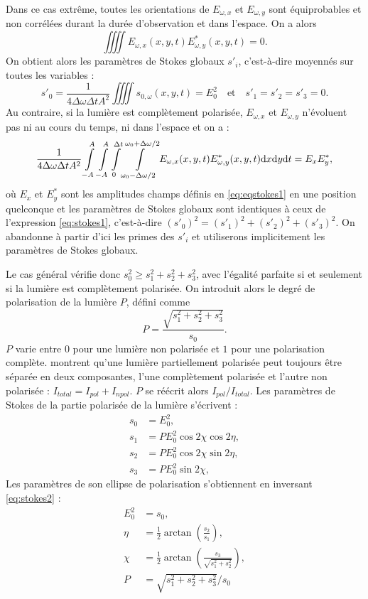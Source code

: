 Dans ce cas extrême, toutes les orientations de $E_{\omega,x}$ et $E_{\omega,y}$ sont équiprobables et non corrélées durant la durée d'observation et dans l'espace. On a alors
\begin{equation}
\iiiint{E_{\omega,x}(x,y,t) E^*_{\omega,y}(x,y,t)} = 0.
\end{equation}
On obtient alors les paramètres de Stokes globaux $s'_i$, c'est-à-dire moyennés sur toutes les variables :
\begin{equation}
s'_0=\frac{1}{4\Delta\omega\Delta t A^2}\iiiint{s_{0,\omega}(x,y,t)} = E_0^2 \quad\text{et}\quad s'_1=s'_2=s'_3=0.
\end{equation}
Au contraire, si la lumière est complètement polarisée, $E_{\omega,x}$ et $E_{\omega,y}$ n'évoluent pas ni au cours du temps, ni dans l'espace et on a :
\begin{equation}
\frac{1}{4\Delta\omega\Delta t A^2}\int\limits_{-A}^A\int\limits_{-A}^A\int\limits_0^{\Delta t}\int\limits_{\omega_0-\Delta\omega/2}^{\omega_0+\Delta\omega/2}{E_{\omega,x}(x,y,t) E^*_{\omega,y}(x,y,t)\mathrm{d} x\mathrm{d} y\mathrm{d} t} = E_x E^*_y,
\end{equation}
où $E_x$ et $E^*_y$ sont les amplitudes champs définis en \ref{eq:eqstokes1} en une position quelconque et les paramètres de Stokes globaux sont identiques à ceux de l'expression \ref{eq:stokes1}, c'est-à-dire $(s'_0)^2 = (s'_1)^2+(s'_2)^2+(s'_3)^2$. On abandonne à partir d'ici les primes des $s'_i$ et utiliserons implicitement les paramètres de Stokes globaux. 

Le cas général vérifie donc $s_0^2 \geq s_1^2+s_2^2+s_3^2$, avec l'égalité parfaite si et seulement si la lumière est complètement polarisée. On introduit alors le degré de polarisation de la lumière $P$, défini comme 
\begin{equation}
P = \frac{\sqrt{s_1^2+s_2^2+s_3^2}}{s_0}.
\end{equation}
$P$ varie entre $0$ pour une lumière non polarisée et $1$ pour une polarisation complète.  montrent qu'une lumière partiellement polarisée peut toujours être séparée en deux composantes, l'une complètement polarisée et l'autre non polarisée : $I_{total} = I_{pol} + I_{npol}$. $P$ se réécrit alors $I_{pol}/I_{total}$. Les paramètres de Stokes de la partie polarisée de la lumière s'écrivent :
\begin{align}
s_0 &= E_0^2,\nonumber\\
s_1 &= PE_0^2\cos 2\chi\cos 2\eta ,\nonumber\\
s_2 &= PE_0^2\cos 2\chi\sin 2\eta,\nonumber\\
s_3 &= PE_0^2\sin 2\chi,	
\label{eq:stokes2}
\end{align}
Les paramètres de son ellipse de polarisation s'obtiennent en inversant \ref{eq:stokes2} :
\begin{align}
E_0^2 &= s_0,\nonumber\\
\eta &= \frac{1}{2} \arctan\left(\frac{s_2}{s_1}\right),\nonumber\\
\chi &= \frac{1}{2} \arctan\left(\frac{s_3}{\sqrt{s_1^2+s_2^2}}\right),\nonumber\\
P &= \sqrt{s_1^2+s_2^2+s_3^2}/s_0
\label{eq:stokes2inv}
\end{align}

